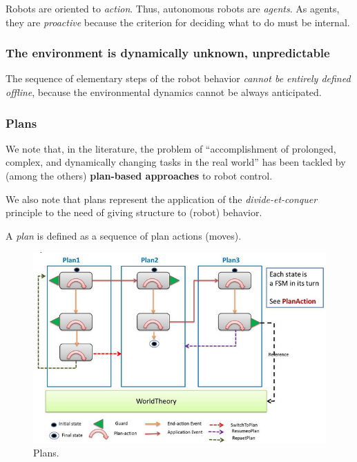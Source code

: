 \documentclass[11pt]{article}
\begin{document}
  Robots are oriented to \emph{action}. Thus, autonomous robots are
  \emph{agents}. As agents, they are \emph{proactive} because the 
  criterion for deciding what to do must be internal.

\subsubsection{The environment is dynamically unknown, unpredictable}

The sequence of elementary steps of the robot behavior \emph{cannot be entirely
defined offline}, because the environmental dynamics cannot be always anticipated. 
 
 
\subsubsection{Plans}
 
 We note that, in the literature, the problem of ``accomplishment of prolonged,
 complex, and dynamically changing tasks in the real world'' has been tackled
 by (among the others) \textbf{plan-based approaches} to robot control.

 We also note that plans represent the application of the
 \emph{divide-et-conquer} principle to the need of giving structure to
 (robot) behavior.
 
 A \emph{plan} is defined as a sequence of plan actions (moves).


\begin{figure}[H]
    \centering
     \includegraphics[scale=0.60, trim=4cm 0 0
     -1cm]{img/concept_plan.png}
    \caption{Plans.}
    \label{fig:plans}
\end{figure}  
\end{document}
